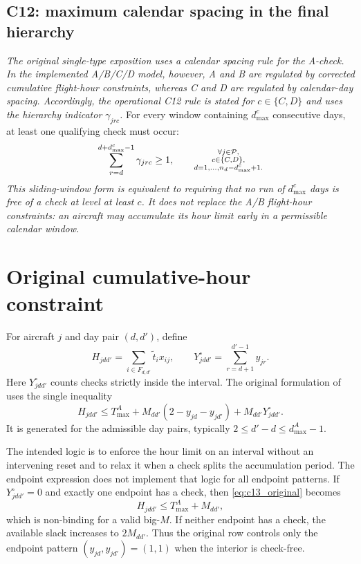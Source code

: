 \subsection{C12: maximum calendar spacing in the final hierarchy}

\textit{The original single-type exposition uses a calendar spacing rule for
the A-check. In the implemented A/B/C/D model, however, A and B are regulated
by corrected cumulative flight-hour constraints, whereas C and D are regulated
by calendar-day spacing. Accordingly, the operational C12 rule is stated for
$c\in\{C,D\}$ and uses the hierarchy indicator $\gamma_{jrc}$.} For every
window containing $d_{\max}^{c}$ consecutive days, at least one qualifying
check must occur:
\begin{equation}
    \sum_{r=d}^{d+d_{\max}^{c}-1}\gamma_{jrc}\geq1,
    \qquad
    \substack{\forall j\in\mathcal{P},\\
    c\in\{C,D\},\\
    d=1,\ldots,n_d-d_{\max}^{c}+1.}
    \label{eq:maint_c12}
\end{equation}
\textit{This sliding-window form is equivalent to requiring that no run of
$d_{\max}^{c}$ days is free of a check at level at least $c$. It does not
replace the A/B flight-hour constraints: an aircraft may accumulate its hour
limit early in a permissible calendar window.}

\section{Original cumulative-hour constraint}

For aircraft $j$ and day pair $(d,d')$, define
\begin{equation}
    H_{jdd'}=\sum_{i\in F_{d,d'}}\tilde t_i x_{ij},
    \qquad
    Y_{jdd'}^{\circ}=\sum_{r=d+1}^{d'-1}y_{jr}.
    \label{eq:maint_interval_hours}
\end{equation}
Here $Y_{jdd'}^{\circ}$ counts checks strictly inside the interval. The
original formulation of \citet{khaled2018compact} uses the single inequality
\begin{equation}
    H_{jdd'}\leq T_{\max}^{A}
    +M_{dd'}(2-y_{jd}-y_{jd'})
    +M_{dd'}Y_{jdd'}^{\circ}.
    \label{eq:c13_original}
\end{equation}
It is generated for the admissible day pairs, typically
$2\leq d'-d\leq d_{\max}^{A}-1$.

The intended logic is to enforce the hour limit on an interval without an
intervening reset and to relax it when a check splits the accumulation period.
The endpoint expression does not implement that logic for all endpoint
patterns. If $Y_{jdd'}^{\circ}=0$ and exactly one endpoint has a check, then
\eqref{eq:c13_original} becomes
\begin{equation}
    H_{jdd'}\leq T_{\max}^{A}+M_{dd'},
    \label{eq:c13_original_one_endpoint}
\end{equation}
which is non-binding for a valid big-$M$. If neither endpoint has a check, the
available slack increases to $2M_{dd'}$. Thus the original row controls only
the endpoint pattern $(y_{jd},y_{jd'})=(1,1)$ when the interior is check-free.


